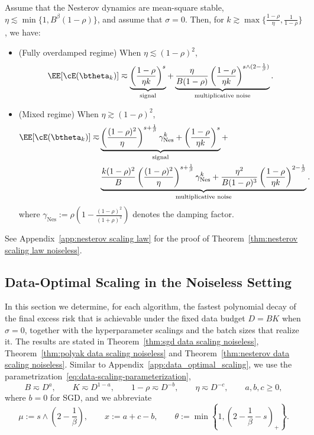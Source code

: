 \begin{theorem}
\label{thm:nesterov scaling law noiseless}
Assume that the Nesterov dynamics are mean-square stable, $\eta\lesssim\min\{1,B^\beta(1-\rho)\}$, and assume that \(\sigma=0\). Then, for $k\gtrsim\max\{\frac{1-\rho}{\eta},\frac{1}{1-\rho}\}$, we have:
\begin{itemize}
\item (Fully overdamped regime) When \(\eta\lesssim(1-\rho)^2\),
\begin{equation}
\label{eq:nag-loss-overdamped-noiseless}
\EE[\cE(\btheta_k)]
\eqsim
\underbrace{
\left(\frac{1-\rho}{\eta k}\right)^s
}_{\text{signal}}
+
\underbrace{
\frac{\eta}{B(1-\rho)}\left(\frac{1-\rho}{\eta k}\right)^{s\wedge(2-\frac{1}{\beta})}
}_{\text{multiplicative noise}}.
\end{equation}
\vspace{-1em}
\item (Mixed regime) When \(\eta\gtrsim(1-\rho)^2\),
\begin{equation}
\label{eq:nag-loss-mixed-noiseless}
\begin{aligned}
\EE[\cE(\btheta_k)]
\eqsim
&\underbrace{\left(\frac{(1-\rho)^2}{\eta}\right)^{s+\frac{1}{\beta}}\gamma_{\mathrm{Nes}}^k+
\left(\frac{1-\rho}{\eta k}\right)^s
}_{\text{signal}}
+\\
&\underbrace{\frac{k(1-\rho)^2}{B} \left(\frac{(1-\rho)^2}{\eta}\right)^{s+\frac{1}{\beta}}\gamma_{\mathrm{Nes}}^k + \frac{\eta^2}{B(1-\rho)^3}\left(\frac{1-\rho}{\eta k}\right)^{2-\frac 1\beta}}_{\text{multiplicative noise}}
.
\vspace{-0.5em}
\end{aligned}
\end{equation}
where $\gamma_{\mathrm{Nes}}:=\rho\left(1-\frac{(1-\rho)^2}{(1+\rho)^2}\right)$ denotes the damping factor.
\end{itemize}
\end{theorem}
See Appendix~\ref{app:nesterov scaling law} for the proof of Theorem~\ref{thm:nesterov scaling law noiseless}.


\subsection{Data-Optimal Scaling in the Noiseless Setting}
\label{app:sigma0_data}

In this section we determine, for each algorithm, the fastest polynomial decay of the final excess risk that is achievable under the fixed data budget \(D=BK\) when \(\sigma=0\), together with the hyperparameter scalings and the batch sizes that realize it. The results are stated in Theorem~\ref{thm:sgd data scaling noiseless}, Theorem~\ref{thm:polyak data scaling noiseless} and Theorem~\ref{thm:nesterov data scaling noiseless}. Similar to Appendix~\ref{app:data_optimal_scaling}, we use the parametrization~\eqref{eq:data-scaling-parameterization},
\[
    B\eqsim D^{a},
    \qquad
    K\eqsim D^{1-a},
    \qquad
    1-\rho\eqsim D^{-b},
    \qquad
    \eta\eqsim D^{-c},
    \qquad
    a,b,c\geq0,
\]
where \(b=0\) for SGD, and we abbreviate
\[
    \mu:=s\wedge\left(2-\frac1\beta\right),
    \qquad
    x:=a+c-b,
    \qquad
    \theta:=\min\left\{1,\left(2-\frac1\beta-s\right)_{+}\right\}.
\]


